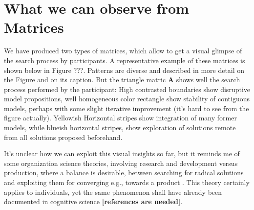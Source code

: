 \section{What we can observe from Matrices} We have produced two types of matrices, which allow to get a visual glimpse of the search process by participants. A representative example of these matrices is shown below in Figure ???. Patterns are diverse and described in more detail on the Figure and on its caption. But the triangle matric {\bf A} shows well the search process performed by the participant: High contrasted boundaries show disruptive model propositions, well homogeneous color rectangle show stability of contiguous models, perhaps with some slight iterative improvement (it's hard to see from the figure actually). Yellowish Horizontal stripes show integration of many former models, while blueish horizontal stripes, show exploration of solutions remote from all solutions proposed beforehand.  

It's unclear how we can exploit this visual insights so far, but it reminds me of some organization science theories, involving research and development versus production, where a balance is desirable, between searching for radical solutions and exploiting them for converging e.g., towards a product \cite{March_1991}. This theory certainly applies to individuals, yet the same phenomenon shall have already been documented in cognitive science {\bf [references are needed]}. 
  
  